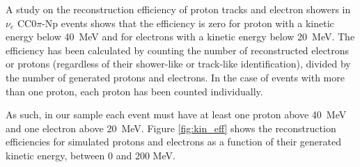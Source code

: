 A study on the reconstruction efficiency of proton tracks and electron showers in $\nu_{e}$ CC$0\pi$-Np events shows that the efficiency is zero for proton with a kinetic energy below 40~MeV and for electrons with a kinetic energy below 20~MeV. The efficiency has been calculated by counting the number of reconstructed electrons or protons (regardless of their shower-like or track-like identification), divided by the number of generated protons and electrons. In the case of events with more than one proton, each proton has been counted individually.

As such, in our sample each event must have at least one proton above 40~MeV and one electron above 20~MeV. Figure \ref{fig:kin_eff} shows the reconstruction efficiencies for simulated protons and electrons as a function of their generated kinetic energy, between 0 and 200 MeV.

